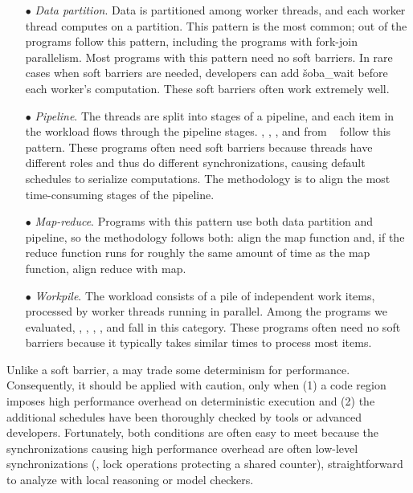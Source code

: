 \begin{enumerate}

\item[$\bullet$] {\em Data partition}. Data is partitioned among worker
  threads, and each worker thread computes on a partition. This pattern is
  the most common; \ndatapartition out of the \nprog programs follow this
  pattern, including the programs with fork-join parallelism.  Most
  programs with this pattern need no soft barriers.  In rare cases when
  soft barriers are needed, developers can add \v{soba\_wait} before each
  worker's computation.  These soft barriers often work extremely well.

\item[$\bullet$] {\em Pipeline}. The threads are split into stages of a
  pipeline, and each item in the workload flows through the pipeline
  stages.  \ferret, \dedup, \vips, and \xtwosixfour from \parsec~\cite{parsec} follow this pattern.
  These programs often need soft barriers because
  threads have different roles and thus do different synchronizations,
  causing default schedules to serialize computations.  The
  methodology is to align the most time-consuming stages of the
  pipeline.

\item[$\bullet$] {\em Map-reduce}. Programs with this pattern use both data
  partition and pipeline, so the methodology follows both: align the
  map function and, if the reduce function runs for roughly the same
  amount of time as the map function, align reduce with map.

\item[$\bullet$] {\em Workpile}. The workload consists of a pile of independent
  work items, processed by worker threads running in parallel.  Among the
  programs we evaluated, \bdb, \openldap, \redis, \pfscan, and \aget fall
  in this category.  These programs often need no soft barriers because
  it typically takes similar times to process most items.

\end{enumerate}


 Unlike a soft barrier, a \nondet may trade
some determinism for performance. Consequently, it should be applied with caution,
only when (1) a code region imposes high performance overhead on deterministic execution
and (2) the additional schedules have been thoroughly checked by tools or
advanced developers.  Fortunately, both conditions are often easy to meet
because the synchronizations causing high performance overhead are often low-level
synchronizations (\eg, lock operations protecting a shared counter),
straightforward to analyze with local reasoning or model checkers.

